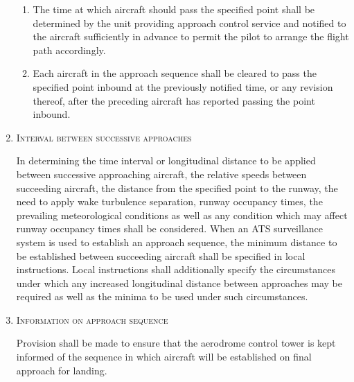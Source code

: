 \begin{enumeratesc}
\begin{enumerate}[labelindent=0pt,itemsep=0.2cm]
\begin{enumerate}
            \item The time at which aircraft should pass the specified point shall be determined by the unit providing approach control service and notified to the aircraft sufficiently in advance to permit the pilot to arrange the flight path accordingly.
            \item Each aircraft in the approach sequence shall be cleared to pass the specified point inbound at the previously notified time, or any revision thereof, after the preceding aircraft has reported passing the point inbound.
        \end{enumerate}

        \item \textsc{Interval between successive approaches}

        \noindent In determining the time interval or longitudinal distance to be applied between successive approaching aircraft, the relative speeds between succeeding aircraft, the distance from the specified point to the runway, the need to apply wake turbulence separation, runway occupancy times, the prevailing meteorological conditions as well as any condition which may affect runway occupancy times shall be considered. When an ATS surveillance system is used to establish an approach sequence, the minimum distance to be established between succeeding aircraft shall be specified in local instructions. Local instructions shall additionally specify the circumstances under which any increased longitudinal distance between approaches may be required as well as the minima to be used under such circumstances.

        \item \textsc{Information on approach sequence}

        \noindent Provision shall be made to ensure that the aerodrome control tower is kept informed of the sequence in which aircraft will be established on final approach for landing.
    \end{enumerate}
\end{enumeratesc}

